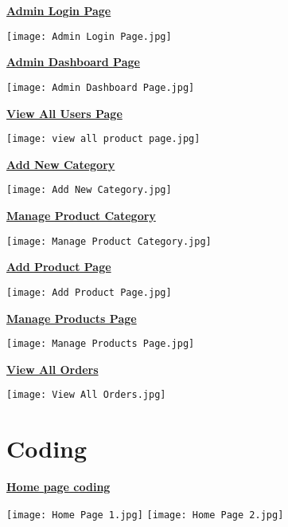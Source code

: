 \documentclass[12pt]{report}
\begin{document}
    \pagebreak
    \large \textbf{\underline{Admin Login Page}}
    \begin{center}
        \texttt{[image: Admin Login Page.jpg]}
    \end{center}
    
    \pagebreak
    \large \textbf{\underline{Admin Dashboard Page}}
    \begin{center}
        \texttt{[image: Admin Dashboard Page.jpg]}
    \end{center}
    
    \pagebreak
    \large \textbf{\underline{View All Users Page}}
    \begin{center}
        \texttt{[image: view all product page.jpg]}
    \end{center}
    
    \pagebreak
    \large \textbf{\underline{Add New Category}}
    \begin{center}
        \texttt{[image: Add New Category.jpg]}
    \end{center}
    
    \pagebreak
    \large \textbf{\underline{Manage Product Category}}
    \begin{center}
        \texttt{[image: Manage Product Category.jpg]}
    \end{center}
    
    \pagebreak
    \large \textbf{\underline{Add Product Page}}
    \begin{center}
        \texttt{[image: Add Product Page.jpg]}
    \end{center}
    
    \pagebreak
    \large \textbf{\underline{Manage Products Page}}
    \begin{center}
        \texttt{[image: Manage Products Page.jpg]}
    \end{center}
    
    \pagebreak
    \large \textbf{\underline{View All Orders}}
    \begin{center}
        \texttt{[image: View All Orders.jpg]}
    \end{center}
    
    \chapter{Coding}
    \textbf{\underline{\large Home page coding}}
    \begin{center}
        \texttt{[image: Home Page 1.jpg]}
        \texttt{[image: Home Page 2.jpg]}
    \end{center}
    
\end{document}
